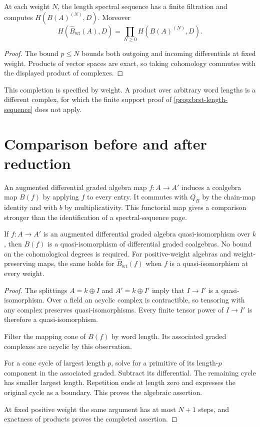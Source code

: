 \begin{corollary}
\label{cor:brst-weight-completion}
At each weight $N$, the length spectral sequence has a finite
filtration and computes $H(B(A)^{(N)},D)$.
Moreover
\[
 H(\widehat B_{\mathrm{wt}}(A),D)
 =\prod_{N\geq0}H(B(A)^{(N)},D).
\]
\end{corollary}
\begin{proof}
The bound $p\leq N$ bounds both outgoing and incoming
differentials at fixed weight.
Products of vector spaces are exact, so taking cohomology commutes
with the displayed product of complexes.
\end{proof}
This completion is specified by weight.
A product over arbitrary word lengths is a different complex,
for which the finite support proof of
\cref{prop:brst-length-sequence} does not apply.

\section{Comparison before and after reduction}
An augmented differential graded algebra map $f:A\to A'$ induces
a coalgebra map $B(f)$ by applying $f$ to every entry.
It commutes with $Q_B$ by the chain-map identity and with $b$
by multiplicativity.
This functorial map gives a comparison stronger than the
identification of a spectral-sequence page.

\begin{theorem}
\label{thm:brst-bar-invariance}
If $f:A\to A'$ is an augmented differential graded algebra
quasi-isomorphism over $k$, then $B(f)$ is a quasi-isomorphism
of differential graded coalgebras.
No bound on the cohomological degrees is required.
For positive-weight algebras and weight-preserving maps, the same
holds for $\widehat B_{\mathrm{wt}}(f)$ when $f$ is a
quasi-isomorphism at every weight.
\end{theorem}
\begin{proof}
The splittings $A=k\oplus I$ and $A'=k\oplus I'$ imply that
$I\to I'$ is a quasi-isomorphism.
Over a field an acyclic complex is contractible, so tensoring
with any complex preserves quasi-isomorphisms.
Every finite tensor power of $I\to I'$ is therefore a
quasi-isomorphism.

Filter the mapping cone of $B(f)$ by word length.
Its associated graded complexes are acyclic by this observation.

For a cone cycle of largest length $p$, solve for a primitive
of its length-$p$ component in the associated graded.
Subtract its differential.  The remaining cycle has smaller
largest length.  Repetition ends at length zero and expresses
the original cycle as a boundary.
This proves the algebraic assertion.

At fixed positive weight the same argument has at most $N+1$
steps, and exactness of products proves the completed assertion.
\end{proof}

